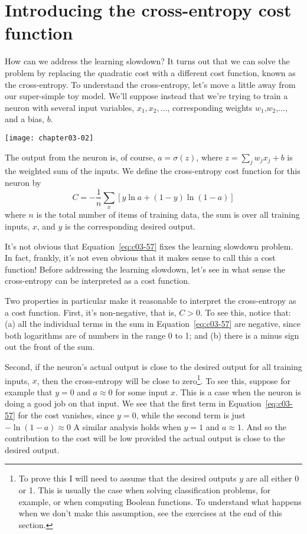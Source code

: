 \section{Introducing the cross-entropy cost function}
\label{sec:Introducingthecross-entropycostfunction}

How can we address the learning slowdown? It turns out that we can solve the problem by replacing the quadratic cost with a different cost function, known as the cross-entropy. To understand the cross-entropy, let's move a little away from our super-simple toy model. We'll suppose instead that we're trying to train a neuron with several input variables, $x_{1}, x_{2}, \dots$, corresponding weights $w_1$,$w_2$,$\ldots$, and a bias, $b$.

\begin{marginfigure}
\texttt{[image: chapter03-02]}
\end{marginfigure}

The output from the neuron is, of course, $a=\sigma(z)$, where $z=\sum_{j} w_{j} x_{j}+b$ is the weighted sum of the inputs. We define the cross-entropy cost function for this neuron by 
\begin{equation}
C=-\frac{1}{n} \sum_{x}[y \ln a+(1-y) \ln (1-a)]
\label{eq:c03-57}
\end{equation}
where $n$ is the total number of items of training data, the sum is over all training inputs, $x$, and $y$ is the corresponding desired output.

It's not obvious that Equation~\ref{eq:c03-57} fixes the learning slowdown problem. In fact, frankly, it's not even obvious that it makes sense to call this a cost function! Before addressing the learning slowdown, let's see in what sense the cross-entropy can be interpreted as a cost function.

Two properties in particular make it reasonable to interpret the cross-entropy as a cost function. First, it's non-negative, that is, $C>0$. To see this, notice that: (a) all the individual terms in the sum in Equation~\ref{eq:c03-57} are negative, since both logarithms are of numbers in the range 0 to 1; and (b) there is a minus sign out the front of the sum.



Second, if the neuron's actual output is close to the desired output for all training inputs, $x$, then the cross-entropy will be close to zero\footnote{To prove this I will need to assume that the desired outputs $y$ are all either 0 or 1. This is usually the case when solving classification problems, for example, or when computing Boolean functions. To understand what happens when we don't make this assumption, see the exercises at the end of this section.}. To see this, suppose for example that $y=0$ and $a\approx 0$ for some input $x$. This is a case when the neuron is doing a good job on that input. We see that the first term in Equation~\ref{eq:c03-57} for the cost vanishes, since $y=0$, while the second term is just 
$-\ln (1-a) \approx 0$ A similar analysis holds when $y=1$ and $a\approx1$. And so the contribution to the cost will be low provided the actual output is close to the desired output.

